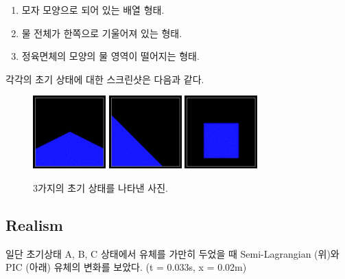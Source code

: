 \documentclass[11pt, A4]{article}
\begin{document}
\begin{enumerate}[label=\Alph*.]
  \item 모자 모양으로 되어 있는 배열 형태.
  \item 물 전체가 한쪽으로 기울어져 있는 형태.
  \item 정육면체의 모양의 물 영역이 떨어지는 형태.
\end{enumerate}

각각의 초기 상태에 대한 스크린샷은 다음과 같다.

\begin{figure}[h]
  \centering
\includegraphics[width=0.25\textwidth]{init_state_1}
\includegraphics[width=0.25\textwidth]{init_state_2}
\includegraphics[width=0.25\textwidth]{init_state_3}
  \caption{3가지의 초기 상태를 나타낸 사진.}
  \label{fluid-init-state}
\end{figure}

\subsection{Realism}

일단 초기상태 A, B, C 상태에서 유체를 가만히 두었을 때 Semi-Lagrangian (위)와 PIC (아래) 유체의 변화를 보았다. (\Delta t = 0.033s, \Delta x = 0.02m)
\end{document}
